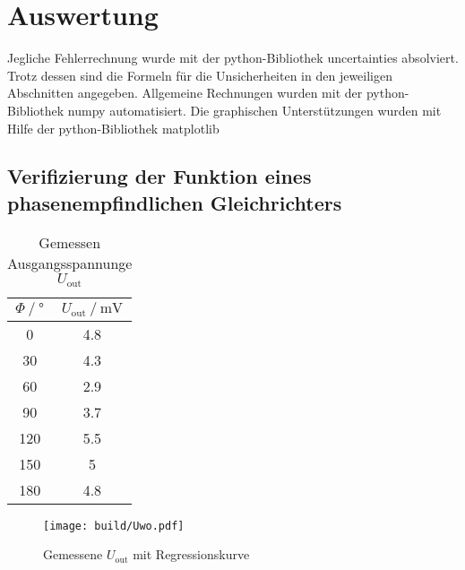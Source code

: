 \section{Auswertung}
\label{sec:Auswertung}Jegliche Fehlerrechnung wurde mit der python-Bibliothek uncertainties \cite{uncertainties} absolviert.
Trotz dessen sind die Formeln für die Unsicherheiten in den jeweiligen Abschnitten angegeben.
Allgemeine Rechnungen wurden mit der python-Bibliothek numpy \cite{numpy} automatisiert. 
Die graphischen Unterstützungen wurden mit Hilfe der python-Bibliothek matplotlib \cite{matplotlib}
\subsection{Verifizierung der Funktion eines phasenempfindlichen Gleichrichters}
\begin{table}
    \centering
    \caption{Gemessen Ausgangsspannunge $U_\text{out}$}
    \label{tab:refraction}
    \begin{tabular} {S[table-format=3.0] S[table-format=1.2]}
        \toprule
        {$\Phi \mathbin{/} \si{\degree}$} & {$U_\text{out} \mathbin{/} \si{\milli\volt}$}\\
           & 4.8 \\
    30      & 4.3 \\
    60      & 2.9 \\
    90      & 3.7 \\
    120     & 5.5 \\
    150     & 5   \\
    180     & 4.8 \\    
    \bottomrule
\end{tabular}
\end{table}
\begin{figure}
    \centering
    \caption{Gemessene $U_\text{out}$ mit Regressionskurve}
    \label{fig:Uwo}
    \texttt{[image: build/Uwo.pdf]}
\end{figure}